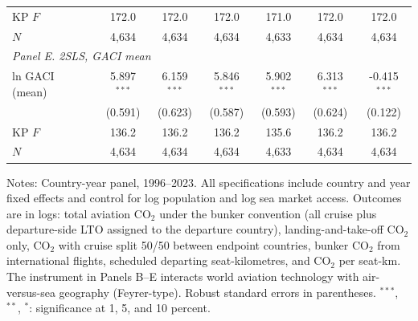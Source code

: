 \documentclass[12pt]{article}
\begin{document}
\begin{table}[htbp]
\begin{threeparttable}
\begin{tabular}{lcccccc}
  KP $F$ & 172.0 & 172.0 & 172.0 & 171.0 & 172.0 & 172.0 \\
  $N$ & 4,634 & 4,634 & 4,634 & 4,633 & 4,634 & 4,634 \\
\midrule
\multicolumn{7}{l}{\textit{Panel E. 2SLS, GACI mean}} \\
  ln GACI (mean) & 5.897$^{***}$ & 6.159$^{***}$ & 5.846$^{***}$ & 5.902$^{***}$ & 6.313$^{***}$ & -0.415$^{***}$ \\
   & (0.591) & (0.623) & (0.587) & (0.593) & (0.624) & (0.122) \\
  KP $F$ & 136.2 & 136.2 & 136.2 & 135.6 & 136.2 & 136.2 \\
  $N$ & 4,634 & 4,634 & 4,634 & 4,633 & 4,634 & 4,634 \\
\bottomrule
\end{tabular}
\begin{tablenotes}[flushleft]
\footnotesize
\item Notes: Country-year panel, 1996--2023. All specifications include country and year fixed effects and control for log population and log sea market access. Outcomes are in logs: total aviation CO$_2$ under the bunker convention (all cruise plus departure-side LTO assigned to the departure country), landing-and-take-off CO$_2$ only, CO$_2$ with cruise split 50/50 between endpoint countries, bunker CO$_2$ from international flights, scheduled departing seat-kilometres, and CO$_2$ per seat-km. The instrument in Panels B--E interacts world aviation technology with air-versus-sea geography (Feyrer-type). Robust standard errors in parentheses. $^{***}$, $^{**}$, $^{*}$: significance at 1, 5, and 10 percent.
\end{tablenotes}
\end{threeparttable}
\end{table}
\end{document}
